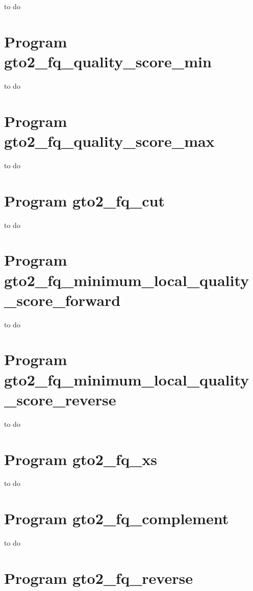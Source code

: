 \documentclass[11pt,]{krantz}
\begin{document}
to do

\section{Program
gto2\_fq\_quality\_score\_min}\label{program-gto2_fq_quality_score_min}

to do

\section{Program
gto2\_fq\_quality\_score\_max}\label{program-gto2_fq_quality_score_max}

to do

\section{Program gto2\_fq\_cut}\label{program-gto2_fq_cut}

to do

\section{Program
gto2\_fq\_minimum\_local\_quality\_score\_forward}\label{program-gto2_fq_minimum_local_quality_score_forward}

to do

\section{Program
gto2\_fq\_minimum\_local\_quality\_score\_reverse}\label{program-gto2_fq_minimum_local_quality_score_reverse}

to do

\section{Program gto2\_fq\_xs}\label{program-gto2_fq_xs}

to do

\section{Program gto2\_fq\_complement}\label{program-gto2_fq_complement}

to do

\section{Program gto2\_fq\_reverse}\label{program-gto2_fq_reverse}
\end{document}
